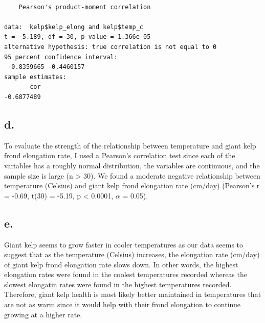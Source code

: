 \documentclass[
  letterpaper,
  DIV=11,
  numbers=noendperiod]{scrartcl}
\newenvironment{Shaded}{\begin{snugshade}}{\end{snugshade}}
\newcommand{\AttributeTok}[1]{\textcolor[rgb]{0.40,0.45,0.13}{#1}}
\newcommand{\CommentTok}[1]{\textcolor[rgb]{0.37,0.37,0.37}{#1}}
\newcommand{\FunctionTok}[1]{\textcolor[rgb]{0.28,0.35,0.67}{#1}}
\newcommand{\NormalTok}[1]{\textcolor[rgb]{0.00,0.23,0.31}{#1}}
\newcommand{\SpecialCharTok}[1]{\textcolor[rgb]{0.37,0.37,0.37}{#1}}
\newcommand{\StringTok}[1]{\textcolor[rgb]{0.13,0.47,0.30}{#1}}
\begin{document}
\begin{Shaded}
\end{Shaded}

\begin{verbatim}

    Pearson's product-moment correlation

data:  kelp$kelp_elong and kelp$temp_c
t = -5.189, df = 30, p-value = 1.366e-05
alternative hypothesis: true correlation is not equal to 0
95 percent confidence interval:
 -0.8359665 -0.4460157
sample estimates:
       cor 
-0.6877489 
\end{verbatim}

\subsection{d.}\label{d.}

To evaluate the strength of the relationship between temperature and
giant kelp frond elongation rate, I used a Pearson's correlation test
since each of the variables has a roughly normal distribution, the
variables are continuous, and the sample size is large (n \textgreater{}
30). We found a moderate negative relationship between temperature
(Celsius) and giant kelp frond elongation rate (cm/day) (Pearson's r =
-0.69, t(30) = -5.19, p \textless{} 0.0001, \(\alpha\) = 0.05).

\subsection{e.}\label{e.}

Giant kelp seems to grow faster in cooler temperatures as our data seems
to suggest that as the temperature (Celsius) increases, the elongation
rate (cm/day) of giant kelp frond elongation rate slows down. In other
words, the highest elongation rates were found in the coolest
temperatures recorded whereas the slowest elongatin rates were found in
the highest temperatures recorded. Therefore, giant kelp health is most
likely better maintained in temperatures that are not as warm since it
would help with their frond elongation to continue growing at a higher
rate.
\end{document}
